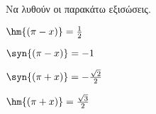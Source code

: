 Να λυθούν οι παρακάτω εξισώσεις.
\begin{multicols}{2}
\begin{alist}[leftmargin=2mm]
\item $ \hm{\left( \pi-x\right) }=\frac{1}{2} $
\item $ \syn{\left(\pi-x\right) }=-1 $
\item $ \syn{\left(\pi+x\right) }=-\frac{\sqrt{2}}{2} $
\item $ \hm{\left(\pi+x \right) }=\frac{\sqrt{3}}{2} $
\end{alist}
\end{multicols}
